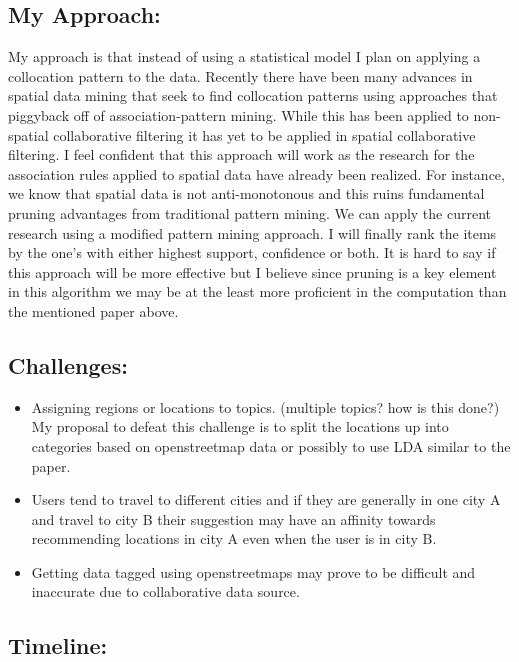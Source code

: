 \documentclass[11pt]{article}
\begin{document}
\subsection{My Approach:}
My approach is that instead of using a statistical model I plan on applying a collocation pattern to the data. Recently there have been many advances in spatial data mining that seek to find collocation patterns using approaches that piggyback off of association-pattern mining. While this has been applied to non-spatial collaborative filtering it has yet to be applied in spatial collaborative filtering. I feel confident that this approach will work as the research for the association rules applied to spatial data have already been realized. For instance, we know that spatial data is not anti-monotonous and this ruins fundamental pruning advantages from traditional pattern mining. We can apply the current research using a modified pattern mining approach. I will finally rank the items by the one's with either highest support, confidence or both. It is hard to say if this approach will be more effective but I believe since pruning is a key element in this algorithm we may be at the least more proficient in the computation than the mentioned paper above. 


\subsection{Challenges:}

\begin{itemize}
	\item Assigning regions or locations to topics. (multiple topics? how is this done?) My proposal to defeat this challenge is to split the locations up into categories based on openstreetmap data or possibly to use LDA similar to the paper. 
	\item Users tend to travel to different cities and if they are generally in one city A and travel to city B their suggestion may have an affinity towards recommending locations in city A even when the user is in city B.
	\item Getting data tagged using openstreetmaps may prove to be difficult and inaccurate due to collaborative data source.
	
\end{itemize}

\subsection{Timeline: }
\end{document}
